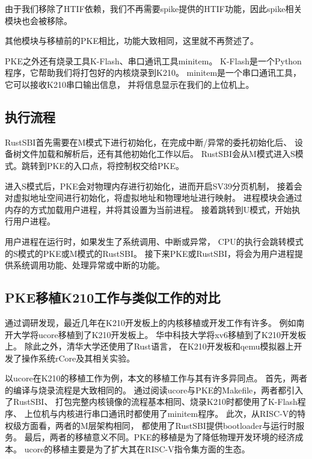 由于我们移除了HTIF依赖，我们不再需要spike提供的HTIF功能，因此spike相关模块也会被移除。

其他模块与移植前的PKE相比，功能大致相同，这里就不再赘述了。

PKE之外还有烧录工具K-Flash、串口通讯工具minitem。
K-Flash是一个Python程序，它帮助我们将打包好的内核烧录到K210\cite{2002Flash}。
minitem是一个串口通讯工具，它可以接收K210串口输出信息，
并将信息显示在我们的上位机上。


\subsection{执行流程}



RustSBI首先需要在M模式下进行初始化，在完成中断/异常的委托初始化后、
设备树文件加载和解析后，还有其他初始化工作以后。
RustSBI会从M模式进入S模式。跳转到PKE的入口点，将控制权交给PKE。

进入S模式后，PKE会对物理内存进行初始化，进而开启SV39分页机制，
接着会对虚拟地址空间进行初始化，将虚拟地址和物理地址进行映射。
进程模块会通过内存的方式加载用户进程，并将其设置为当前进程。
接着跳转到U模式，开始执行用户进程。

用户进程在运行时，如果发生了系统调用、中断或异常，
CPU的执行会跳转模式的S模式的PKE或M模式的RustSBI。
接下来PKE或RustSBI，将会为用户进程提供系统调用功能、处理异常或中断的功能。


\subsection{PKE移植K210工作与类似工作的对比}

通过调研发现，最近几年在K210开发板上的内核移植或开发工作有许多。
例如南开大学将ucore移植到了K210开发板上。
华中科技大学将xv6移植到了K210开发板上\cite{xv6_k210_GitHub}。
除此之外，清华大学还使用了Rust语言，
在K210开发板和qemu模拟器上开发了操作系统rCore及其相关实验\cite{rCore_GitHub}。

以ucore在K210的移植工作为例，本文的移植工作与其有许多异同点。
首先，两者的编译与烧录流程是大致相同的。
通过阅读ucore与PKE的Makefile，两者都引入了RustSBI、
打包完整内核镜像的流程基本相同、烧录K210时都使用了K-Flash程序、
上位机与内核进行串口通讯时都使用了minitem程序\cite{NKU_ucore_GitHub}。
此次，从RISC-V的特权级方面看，两者的M层架构相同，
都使用了RustSBI提供bootloader与运行时服务。
最后，两者的移植意义不同。PKE的移植是为了降低物理开发环境的经济成本。
ucore的移植主要是为了扩大其在RISC-V指令集方面的生态。